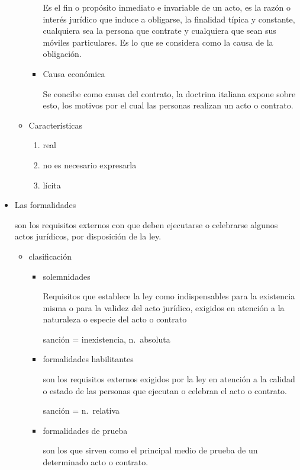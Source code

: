 \documentclass[]{article}
\providecommand{\tightlist}{%
  \setlength{\itemsep}{0pt}\setlength{\parskip}{0pt}}
\begin{document}
\begin{itemize}
\begin{itemize}
\begin{itemize}
      Es el fin o propósito inmediato e invariable de un acto, es la
      razón o interés jurídico que induce a obligarse, la finalidad
      típica y constante, cualquiera sea la persona que contrate y
      cualquiera que sean sus móviles particulares. Es lo que se
      considera como la causa de la obligación.
    \item
      Causa económica

      Se concibe como causa del contrato, la doctrina italiana expone
      sobre esto, los motivos por el cual las personas realizan un acto
      o contrato.
    \end{itemize}
  \item
    Características

    \begin{enumerate}
    \def\labelenumi{\arabic{enumi}.}
    \tightlist
    \item
      real
    \item
      no es necesario expresarla
    \item
      lícita
    \end{enumerate}
  \end{itemize}
\item
  Las formalidades

  son los requisitos externos con que deben ejecutarse o celebrarse
  algunos actos jurídicos, por disposición de la ley.

  \begin{itemize}
  \tightlist
  \item
    clasificación

    \begin{itemize}
    \item
      solemnidades

      Requisitos que establece la ley como indispensables para la
      existencia misma o para la validez del acto jurídico, exigidos en
      atención a la naturaleza o especie del acto o contrato

      sanción = inexistencia, n.~absoluta
    \item
      formalidades habilitantes

      son los requisitos externos exigidos por la ley en atención a la
      calidad o estado de las personas que ejecutan o celebran el acto o
      contrato.

      sanción = n.~relativa
    \item
      formalidades de prueba

      son los que sirven como el principal medio de prueba de un
      determinado acto o contrato.


\end{itemize}
\end{itemize}
\end{itemize}
\end{document}
